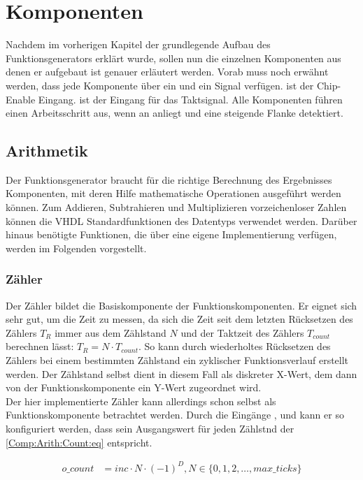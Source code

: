 \chapter{Komponenten}
Nachdem im vorherigen Kapitel der grundlegende Aufbau des Funktionsgenerators erklärt wurde, sollen nun die einzelnen Komponenten aus denen er aufgebaut ist genauer erläutert werden.
Vorab muss noch erwähnt werden, dass jede Komponente über ein  und ein  Signal verfügen.
 ist der Chip-Enable Eingang.  ist der Eingang für das Taktsignal.
Alle Komponenten führen einen Arbeitsschritt aus, wenn an   anliegt und  eine steigende Flanke detektiert.

\section{Arithmetik}
Der Funktionsgenerator braucht für die richtige Berechnung des Ergebnisses Komponenten, mit deren Hilfe mathematische Operationen ausgeführt werden können.
Zum Addieren, Subtrahieren und Multiplizieren vorzeichenloser Zahlen können die VHDL Standardfunktionen des Datentyps  verwendet werden.
Darüber hinaus benötigte Funktionen, die über eine eigene Implementierung verfügen, werden im Folgenden vorgestellt.

\subsection{Zähler} \label{Comp:Arith:Count}
Der Zähler bildet die Basiskomponente der Funktionskomponenten. Er eignet sich sehr gut, um die Zeit zu messen, da sich die Zeit seit dem letzten Rücksetzen des Zählers $T_{R}$ immer aus dem Zählstand $N$ und der Taktzeit des Zählers $T_{count}$ berechnen lässt: $T_{R} = N \cdot T_{count}$. So kann durch wiederholtes Rücksetzen des Zählers bei einem bestimmten Zählstand ein zyklischer Funktionsverlauf erstellt werden.
Der Zählstand selbst dient in diesem Fall als diskreter X-Wert, dem dann von der Funktionskomponente ein Y-Wert zugeordnet wird.\\
Der hier implementierte Zähler kann allerdings schon selbst als Funktionskomponente betrachtet werden.
Durch die Eingänge ,  und  kann er so konfiguriert werden, dass sein Ausgangswert  für jeden Zählstnd  der \cref{Comp:Arith:Count:eq} entspricht.

\begin{align}
o\_count &= inc \cdot N \cdot (-1) ^ D, N \in \{0, 1, 2, \dots, max\_ticks\} \label{Comp:Arith:Count:eq}
\end{align}

